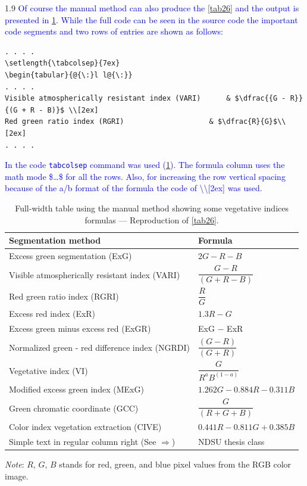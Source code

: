 \documentclass[phd]{ndsu-thesis-2022}
\newcommand\myspacing{1.9} %
\newcommand\italk[1]{\textcolor{blue}{#1}}  %
\newcommand\vb[1]{\textcolor{blue}{\texttt{#1}}}%
\begin{document}
\begin{spacing}{\myspacing}
\italk{Of course the manual method can also produce the \cref{tab26} and the output is presented in \cref{tab27}.  While the full code can be seen in the source code the important code segments and two rows of entries are shown as follows:
}

{\singlespacing
\begin{verbatim}
. . . . 
\setlength{\tabcolsep}{7ex}
\begin{tabular}{@{\:}l l@{\:}}
. . . . 
Visible atmospherically resistant index (VARI) 		& $\dfrac{{G - R}}
{(G + R - B)}$ \\[2ex]
Red green ratio index (RGRI) 					& $\dfrac{R}{G}$\\[2ex]
. . . . 
\end{verbatim}
}

\vspace{-2ex}
\italk{In the code \vb{tabcolsep} command was used (\cref{tab27}). The formula column uses the math mode \$\ldots\$ for all the rows. Also, for increasing the row vertical spacing because of the a/b format of the formula the code of \textbackslash\textbackslash[2ex] was used.}

\begin{table}[t]
\caption{Full-width table using the manual method showing some vegetative indices formulas --- Reproduction of \cref{tab26}.}
\setlength{\tabcolsep}{7ex}
\begin{tabular}{@{\:}l l@{\:}}
\toprule
Segmentation method  & Formula  \\
\midrule
Excess green segmentation (ExG)    				& $2G - R - B$\\[1ex]
Visible atmospherically resistant index (VARI) 		& $\dfrac{{G - R}}
{(G + R - B)}$ \\[2ex]
Red green ratio index (RGRI) 					& $\dfrac{R}{G}$\\[2ex]
Excess red index (ExR) 						& $1.3R - G$\\[2ex]
Excess green minus excess red (ExGR) 			& \text ExG $-$ ExR\\[2ex]
Normalized green - red difference index (NGRDI)	& $\dfrac{(G - R)}{(G + R)}$\\[2ex]
Vegetative index (VI) 						& $\dfrac{G}{R^a B^{(1-a)}}$\\[3ex]
Modified excess green index (MExG) 			& $ 1.262G - 0.884R - 0.311B$\\[2ex]
Green chromatic coordinate (GCC) 				& $\dfrac{G}{(R + G + B)}$\\[2ex]
Color index vegetation extraction (CIVE) 			& $0.441R - 0.811G + 0.385B$\\[2ex]
Simple text in regular column right (See $\Rightarrow$) & NDSU thesis class\\
\bottomrule
\end{tabular}
\begin{tablenotes}[flushleft]
\footnotesize
\item \hspace{-1ex} \emph{Note}: $R$, $G$, $B$ stands for red, green, and blue pixel values from the RGB color image.
\label{tab27}
\end{tablenotes}
\end{table}


\end{spacing}
\end{document}
